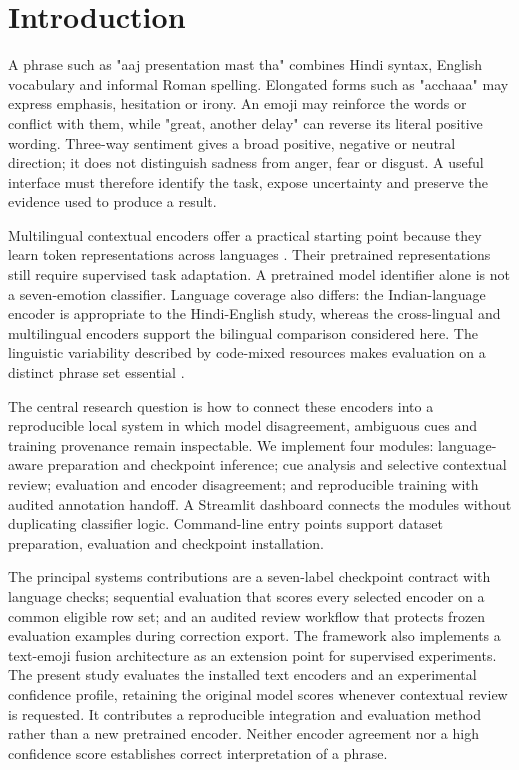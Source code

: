 \documentclass[journal]{IEEEtran}
\begin{document}
\section{Introduction}

A phrase such as "aaj presentation mast tha" combines Hindi syntax, English vocabulary and informal Roman spelling. Elongated forms such as "acchaaa" may express emphasis, hesitation or irony. An emoji may reinforce the words or conflict with them, while "great, another delay" can reverse its literal positive wording. Three-way sentiment gives a broad positive, negative or neutral direction; it does not distinguish sadness from anger, fear or disgust. A useful interface must therefore identify the task, expose uncertainty and preserve the evidence used to produce a result.

Multilingual contextual encoders offer a practical starting point because they learn token representations across languages \cite{devlin2019,conneau2020,khanuja2021}. Their pretrained representations still require supervised task adaptation. A pretrained model identifier alone is not a seven-emotion classifier. Language coverage also differs: the Indian-language encoder is appropriate to the Hindi-English study, whereas the cross-lingual and multilingual encoders support the bilingual comparison considered here. The linguistic variability described by code-mixed resources makes evaluation on a distinct phrase set essential \cite{aguilar2020,vijay2018}.

The central research question is how to connect these encoders into a reproducible local system in which model disagreement, ambiguous cues and training provenance remain inspectable. We implement four modules: language-aware preparation and checkpoint inference; cue analysis and selective contextual review; evaluation and encoder disagreement; and reproducible training with audited annotation handoff. A Streamlit dashboard connects the modules without duplicating classifier logic. Command-line entry points support dataset preparation, evaluation and checkpoint installation.

The principal systems contributions are a seven-label checkpoint contract with language checks; sequential evaluation that scores every selected encoder on a common eligible row set; and an audited review workflow that protects frozen evaluation examples during correction export. The framework also implements a text-emoji fusion architecture as an extension point for supervised experiments. The present study evaluates the installed text encoders and an experimental confidence profile, retaining the original model scores whenever contextual review is requested. It contributes a reproducible integration and evaluation method rather than a new pretrained encoder. Neither encoder agreement nor a high confidence score establishes correct interpretation of a phrase.
\end{document}
